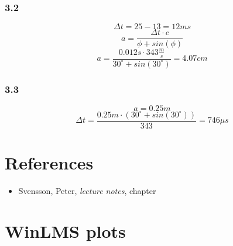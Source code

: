 \documentclass{article}
\begin{document}
\subsubsection{3.2}
$$\Delta t=25-13=12ms$$
\begin{equation}
a=\frac{\Delta t\cdot c}{\phi+sin(\phi)}
\end{equation}
$$ a=\frac{0.012s\cdot 343\frac{m}{s}}{30^\circ+sin(30^\circ)}=4.07cm$$
\subsubsection{3.3}
$$a=0.25m$$
$$\Delta t=\frac{0.25m\cdot(30^\circ+sin(30^\circ))}{343}=746\mu s$$
\newpage
\section{References}
\footnotesize{
\begin{itemize}
\item Svensson, Peter, \textit{lecture notes}, chapter 
\end{itemize}
}

\section{WinLMS plots}
\end{document}
